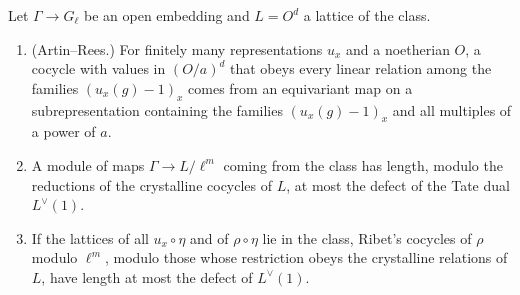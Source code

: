 \begin{proposition}\label{prop:tate-dual-bound}
Let $\Gamma\to G_\ell$ be an open embedding and $L=O^d$ a lattice of the class.
\begin{enumerate}[label=\textup{(\alph*)}]
\item (Artin--Rees.) For finitely many representations $u_x$ and a noetherian $O$, a cocycle with values in $(O/a)^d$ that obeys every linear relation among the families $(u_x(g)-1)_x$ comes from an equivariant map on a
subrepresentation containing the families $(u_x(g)-1)_x$ and all multiples of a power of $a$.
\item A module of maps $\Gamma\to L/\ell^m$ coming from the class has length, modulo the reductions of the crystalline cocycles of $L$, at most the defect of the Tate dual $L^\vee(1)$.
\item If the lattices of all $u_x\circ\eta$ and of $\rho\circ\eta$ lie in the class, Ribet's cocycles of $\rho$ modulo $\ell^m$, modulo those whose restriction obeys the crystalline relations of $L$, have length at most the defect of
$L^\vee(1)$.
\end{enumerate}
\end{proposition}

